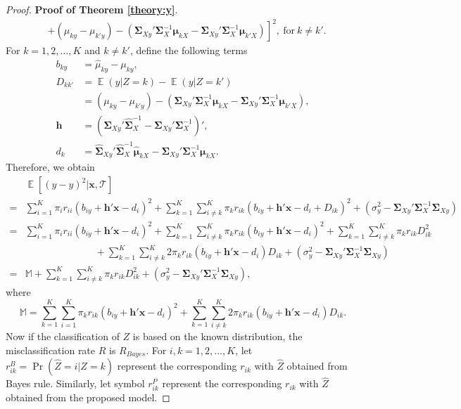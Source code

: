 \documentclass[12pt]{article}
\DeclareMathOperator{\E}{\mathbb{E}}
\begin{document}
\begin{proof}{\textbf{Proof of Theorem \ref{theory:y}}.}{}
\begin{align*}
&+\left.(\mu_{ky}-\mu_{k'y})-\left(\bm \Sigma_{Xy}' \bm \Sigma_{X}^{-1} \bm \mu_{kX}-\bm \Sigma_{Xy}' \bm \Sigma_{X}^{-1}\bm \mu_{k'X}\right)\right]^2,~\mbox{for}~k \neq k'.
\end{align*}
For $k = 1,2,\ldots,K$ and $k \neq k'$, define the following terms
\begin{align*}
b_{ky} &=\hat{\mu}_{ky}-\mu_{ky},\\
D_{kk'} &=\E(y|Z=k)-\E(y|Z=k')   \\
&=(\mu_{ky}-\mu_{k'y})-\left(\bm \Sigma_{Xy}' \bm \Sigma_{X}^{-1}\bm \mu_{kX}-\bm \Sigma_{Xy}' \bm \Sigma_{X}^{-1}\bm \mu_{k'X}\right),\\
\bm h &=\left(\hat{\bm \Sigma}_{Xy}' \hat{\bm \Sigma}_{X}^{-1}-\bm \Sigma_{Xy}' \bm \Sigma_{X}^{-1}\right)',\\
d_k &=\hat{\bm \Sigma}_{Xy}' \hat{\bm \Sigma}_{X}^{-1}\hat{\bm \mu}_{kX}-\bm \Sigma_{Xy}' \bm \Sigma_{X}^{-1}\bm \mu_{kX}.
\end{align*}
Therefore, we obtain
\begin{align*}
&\E[(\hat{y}-y)^2|\bm x, \mathcal{T}] \\
=& \sum_{i=1}^K \pi_i r_{ii} (b_{iy}+\bm h' \bm x-d_i)^2 + \sum_{k=1}^K \sum_{i \neq k}^K \pi_k r_{ik} (b_{iy}+\bm h' \bm x-d_i + D_{ik})^2 + (\sigma_y^2 - \bm \Sigma_{Xy}' \bm \Sigma_{X}^{-1} \bm \Sigma_{Xy}) \\
=& \sum_{i=1}^K \pi_i r_{ii} (b_{iy}+\bm h' \bm x-d_i)^2 + \sum_{k=1}^K \sum_{i \neq k}^K \pi_k r_{ik} (b_{iy}+\bm h' \bm x-d_i)^2 + \sum_{k=1}^K \sum_{i \neq k}^K \pi_k r_{ik} D_{ik}^2 \\
&~~~~~~~~~~~~~~~~~~~~~~~~~~~~~~~~+ \sum_{k=1}^K \sum_{i \neq k}^K 2 \pi_k r_{ik} (b_{iy}+\bm h' \bm x-d_i) D_{ik} + (\sigma_y^2 - \bm \Sigma_{Xy}' \bm \Sigma_{X}^{-1} \bm \Sigma_{Xy})  \\
=& \mathbb{M} + \sum_{k=1}^K \sum_{i \neq k}^K \pi_k r_{ik} D_{ik}^2 +  (\sigma_y^2 - \bm \Sigma_{Xy}' \bm \Sigma_{X}^{-1} \bm \Sigma_{Xy}),
\end{align*}
where $$\mathbb{M} = \sum_{k=1}^K \sum_{i=1}^K \pi_k r_{ik} (b_{iy}+\bm h' \bm x-d_i)^2 + \sum_{k=1}^K \sum_{i \neq k}^K 2 \pi_k r_{ik} (b_{iy}+\bm h' \bm x-d_i) D_{ik}.$$
Now if the classification of $Z$ is based on the known distribution, the misclassification rate $R$ is $R_{Bayes}$.
For $i,k = 1, 2, \ldots, K$, let $r_{ik}^{B} = \Pr(\hat{Z}=i|Z=k)$ represent the corresponding $r_{ik}$ with $\hat{Z}$ obtained from Bayes rule.
Similarly, let symbol $r_{ik}^{P}$ represent the corresponding $r_{ik}$ with $\hat{Z}$ obtained from the proposed model.

\end{proof}
\end{document}
